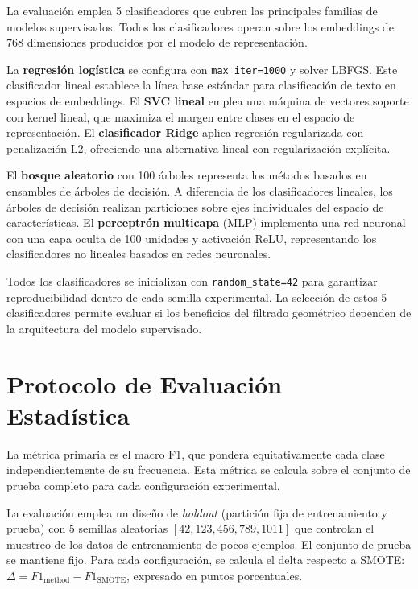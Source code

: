 La evaluación emplea 5 clasificadores que cubren las principales familias de modelos supervisados. Todos los clasificadores operan sobre los embeddings de 768 dimensiones producidos por el modelo de representación.

La \textbf{regresión logística} se configura con \texttt{max\_iter=1000} y solver LBFGS. Este clasificador lineal establece la línea base estándar para clasificación de texto en espacios de embeddings. El \textbf{SVC lineal} emplea una máquina de vectores soporte con kernel lineal, que maximiza el margen entre clases en el espacio de representación. El \textbf{clasificador Ridge} aplica regresión regularizada con penalización L2, ofreciendo una alternativa lineal con regularización explícita.

El \textbf{bosque aleatorio} con 100 árboles representa los métodos basados en ensambles de árboles de decisión. A diferencia de los clasificadores lineales, los árboles de decisión realizan particiones sobre ejes individuales del espacio de características. El \textbf{perceptrón multicapa} (MLP) implementa una red neuronal con una capa oculta de 100 unidades y activación ReLU, representando los clasificadores no lineales basados en redes neuronales.

Todos los clasificadores se inicializan con \texttt{random\_state=42} para garantizar reproducibilidad dentro de cada semilla experimental. La selección de estos 5 clasificadores permite evaluar si los beneficios del filtrado geométrico dependen de la arquitectura del modelo supervisado.

\section{Protocolo de Evaluación Estadística}
\label{sec:protocolo_estadistico}

La métrica primaria es el macro F1, que pondera equitativamente cada clase independientemente de su frecuencia. Esta métrica se calcula sobre el conjunto de prueba completo para cada configuración experimental.

La evaluación emplea un diseño de \textit{holdout} (partición fija de entrenamiento y prueba) con 5 semillas aleatorias $[42, 123, 456, 789, 1011]$ que controlan el muestreo de los datos de entrenamiento de pocos ejemplos. El conjunto de prueba se mantiene fijo. Para cada configuración, se calcula el delta respecto a SMOTE: $\Delta = F1_{\mathrm{method}} - F1_{\mathrm{SMOTE}}$, expresado en puntos porcentuales.

